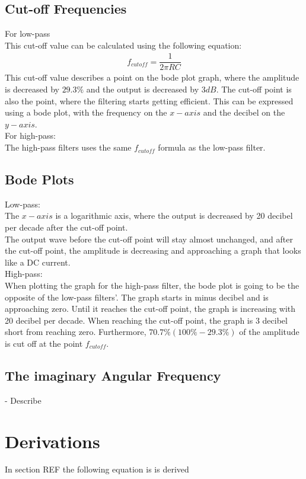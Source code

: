 \subsection{Cut-off Frequencies}
For low-pass \\
This cut-off value can be calculated using the following equation:
\begin{align*}
f_{cutoff}=\dfrac{1}{2 \pi RC}
\end{align*}
This cut-off value describes a point on the bode plot graph, where the amplitude is decreased by $29.3\%$ and the output is decreased by $3dB$. The cut-off point is also the point, where the filtering starts getting efficient. This can be expressed using a bode plot, with the frequency on the $x-axis$ and the decibel on the $y-axis$.\\
For high-pass: \\
The high-pass filters uses the same $f_{cutoff}$ formula as the low-pass filter.

\subsection{Bode Plots}
Low-pass: \\
The $x-axis$ is a logarithmic axis, where the output is decreased by 20 decibel per decade after the cut-off point. \\
The output wave before the cut-off point will stay almost unchanged, and after the cut-off point, the amplitude is decreasing and approaching a graph that looks like a DC current. \\
High-pass: \\
When plotting the graph for the high-pass filter, the bode plot is going to be the opposite of the low-pass filters'. The graph starts in minus decibel and is approaching zero. Until it reaches the cut-off point, the graph is increasing with 20 decibel per decade. When reaching the cut-off point, the graph is 3 decibel short from reaching zero. Furthermore, $70.7\% (100\%-29.3\%)$ of the amplitude is cut off at the point $f_{cutoff}$.
\subsection{The imaginary Angular Frequency}
- Describe
\section{Derivations} \label{Derivations}
In section REF the following equation is is derived \\
